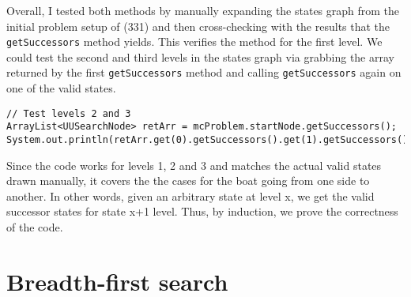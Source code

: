 \documentclass[a4paper]{report}
\begin{document}
Overall, I tested both methods by manually expanding the states graph from the initial problem setup of
(331) and then cross-checking with the results that the \verb`getSuccessors` method yields. This verifies
the method for the first level. We could test the second and third levels in the states graph via grabbing
the array returned by the first \verb`getSuccessors` method and calling \verb`getSuccessors` again on 
one of the valid states.

\begin{lstlisting}
// Test levels 2 and 3
ArrayList<UUSearchNode> retArr = mcProblem.startNode.getSuccessors();
System.out.println(retArr.get(0).getSuccessors().get(1).getSuccessors());
\end{lstlisting}

Since the code works for levels 1, 2 and 3 and matches the actual valid states drawn manually, 
it covers the the cases for the boat going from one side to another. In other words, given an arbitrary
state at level x, we get the valid successor states for state x+1 level. Thus, by induction, we prove
the correctness of the code.

\section{Breadth-first search}
\end{document}
